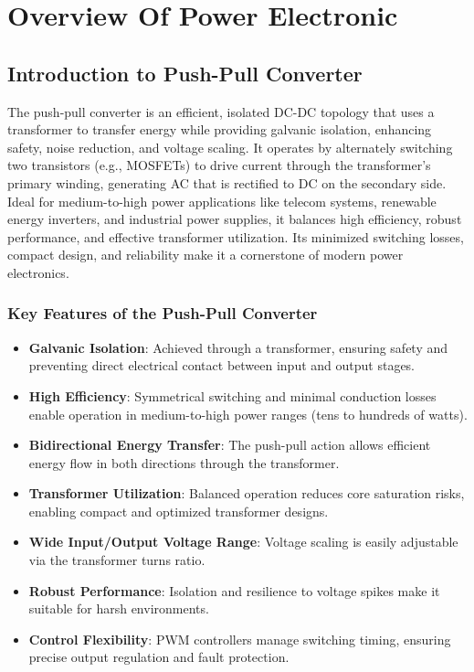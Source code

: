 \section{Overview Of Power Electronic}
\subsection{Introduction to Push-Pull Converter} 
The push-pull converter is an efficient, isolated DC-DC topology that uses a transformer to transfer energy while providing galvanic isolation, enhancing safety, noise reduction, and voltage scaling. It operates by alternately switching two transistors (e.g., MOSFETs) to drive current through the transformer’s primary winding, generating AC that is rectified to DC on the secondary side. Ideal for medium-to-high power applications like telecom systems, renewable energy inverters, and industrial power supplies, it balances high efficiency, robust performance, and effective transformer utilization. Its minimized switching losses, compact design, and reliability make it a cornerstone of modern power electronics.
\subsubsection*{Key Features of the Push-Pull Converter}
\begin{itemize}
    \item \textbf{Galvanic Isolation}: Achieved through a transformer, ensuring safety and preventing direct electrical contact between input and output stages.
    \item \textbf{High Efficiency}: Symmetrical switching and minimal conduction losses enable operation in medium-to-high power ranges (tens to hundreds of watts).
    \item \textbf{Bidirectional Energy Transfer}: The push-pull action allows efficient energy flow in both directions through the transformer.
    \item \textbf{Transformer Utilization}: Balanced operation reduces core saturation risks, enabling compact and optimized transformer designs.
    \item \textbf{Wide Input/Output Voltage Range}: Voltage scaling is easily adjustable via the transformer turns ratio.
    \item \textbf{Robust Performance}: Isolation and resilience to voltage spikes make it suitable for harsh environments.
    \item \textbf{Control Flexibility}: PWM controllers manage switching timing, ensuring precise output regulation and fault protection.
\end{itemize}
